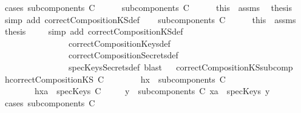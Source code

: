 \begin{isabellebody}
%
\isadelimproof
%
\endisadelimproof
%
\isatagproof
{}\isamarkupfalse%
\ {\isacharparenleft}cases\ {\isachardoublequoteopen}subcomponents\ C\ {\isacharequal}\ {\isacharbraceleft}{\isacharbraceright}{\isachardoublequoteclose}{\isacharparenright}\isanewline
\ \ \isamarkupfalse%
\ {\isachardoublequoteopen}subcomponents\ C\ {\isacharequal}\ {\isacharbraceleft}{\isacharbraceright}{\isachardoublequoteclose}\isanewline
\ \ \isamarkupfalse%
\ this\ \ assms\ \isamarkupfalse%
\ {\isacharquery}thesis\isanewline
\ \ \isamarkupfalse%
\ {\isacharparenleft}simp\ add{\isacharcolon}\ correctCompositionKS{\isacharunderscore}def{\isacharparenright}\isanewline
{}\isamarkupfalse%
\isanewline
\ \ \isamarkupfalse%
\ {\isachardoublequoteopen}subcomponents\ C\ {\isasymnoteq}\ {\isacharbraceleft}{\isacharbraceright}{\isachardoublequoteclose}\isanewline
\ \ \isamarkupfalse%
\ this\ \ assms\ \isamarkupfalse%
\ {\isacharquery}thesis\ \isanewline
\ \ \isamarkupfalse%
\ {\isacharparenleft}simp\ add{\isacharcolon}\ correctCompositionKS{\isacharunderscore}def\ \isanewline
\ \ \ \ \ \ \ \ \ \ \ \ \ \ \ \ correctCompositionKeys{\isacharunderscore}def\ \isanewline
\ \ \ \ \ \ \ \ \ \ \ \ \ \ \ \ correctCompositionSecrets{\isacharunderscore}def\isanewline
\ \ \ \ \ \ \ \ \ \ \ \ \ \ \ \ specKeysSecrets{\isacharunderscore}def{\isacharcomma}\ blast{\isacharparenright}\isanewline
{}\isamarkupfalse%
%
\endisatagproof
{\isafoldproof}%
%
\isadelimproof
\ \isanewline
%
\endisadelimproof
\isanewline
{}\isamarkupfalse%
\ correctCompositionKS{\isacharunderscore}subcomp{}{\isacharcolon}\isanewline
{}\ h{}{\isacharcolon}{\isachardoublequoteopen}correctCompositionKS\ C{\isachardoublequoteclose}\isanewline
\ \ \ \ \ \ \ \ h{}{\isacharcolon}{\isachardoublequoteopen}x\ {\isasymin}\ subcomponents\ C{\isachardoublequoteclose}\isanewline
\ \ \ \ \ \ \ \ h{}{\isacharcolon}{\isachardoublequoteopen}xa\ {\isasymin}\ specKeys\ C{\isachardoublequoteclose}\isanewline
{}\ \ \ \ {\isachardoublequoteopen}{\isasymexists}\ y\ {\isasymin}\ subcomponents\ C{\isachardot}\ {\isacharparenleft}xa\ {\isasymin}\ specKeys\ y{\isacharparenright}{\isachardoublequoteclose}\isanewline
%
\isadelimproof
%
\endisadelimproof
%
\isatagproof
{}\isamarkupfalse%
\ {\isacharparenleft}cases\ {\isachardoublequoteopen}subcomponents\ C\ {\isacharequal}\ {\isacharbraceleft}{\isacharbraceright}{\isachardoublequoteclose}{\isacharparenright}\isanewline

\end{isabellebody}
